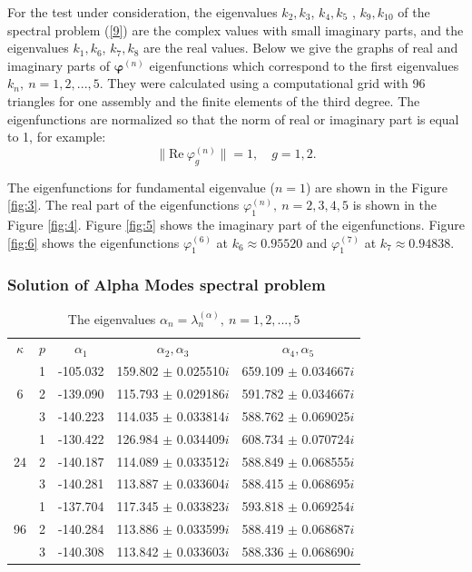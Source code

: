 \documentclass[authoryear]{elsarticle}
\begin{document}
For the test under consideration, the eigenvalues $k_2, k_3$, $k_4, k_5$ , $k_9, k_{10}$ 
of the spectral problem (\ref{9}) are the complex values with small imaginary parts, and the eigenvalues $k_1, k_6$, $k_7, k_8$ are the real values.
Below we give the graphs of real and imaginary parts of $\bm \varphi^{(n)}$ eigenfunctions which correspond to the first eigenvalues $k_n, \ n = 1, 2, ..., 5$. 
They were calculated using a computational grid with 96 triangles for one assembly and the finite elements of the third degree. The eigenfunctions are normalized so that the norm of real or imaginary part is equal to 1, for example:
\[
 \|\mathrm{Re} \ \varphi^{(n)}_g\| = 1, \quad g = 1,2. 
\] 

The eigenfunctions for fundamental eigenvalue ($n=1$) are shown in the Figure \ref{fig:3}.
The real part of the eigenfunctions $\varphi^{(n)}_1, \ n = 2,3,4,5$ is shown in the Figure \ref{fig:4}.
Figure \ref{fig:5} shows the imaginary part of the eigenfunctions. Figure \ref{fig:6} shows the eigenfunctions $\varphi^{(6)}_1$ at $k_6 \approx  0.95520$ and $\varphi^{(7)}_1$ at $k_7 \approx  0.94838$.



\subsubsection{Solution of Alpha Modes spectral problem} 
\begin{table}[h]
\caption{The eigenvalues $\alpha_n = \lambda_n^{(\alpha )}, \ n = 1,2, ..., 5$}
\label{t-3}
\begin{center}
\begin{tabular}{ccccc}
\rowcolor{col1}
$\kappa$ & $p$ & $\alpha_1$ &  $\alpha_2, \alpha_3$ &  $\alpha_4, \alpha_5$ \\ 
\rowcolor{col3}
   & 1 & -105.032 & 159.802 $\pm$ 0.025510$i$  & 659.109 $\pm$ 0.034667$i$  \\
\rowcolor{col2}
6  & 2 & -139.090 & 115.793 $\pm$ 0.029186$i$  & 591.782 $\pm$ 0.034667$i$  \\
\rowcolor{col1}
   & 3 & -140.223 & 114.035 $\pm$ 0.033814$i$  & 588.762 $\pm$ 0.069025$i$  \\
\rowcolor{col3}
   & 1 & -130.422 & 126.984 $\pm$ 0.034409$i$  & 608.734 $\pm$ 0.070724$i$  \\
\rowcolor{col2}
24 & 2 & -140.187 & 114.089 $\pm$ 0.033512$i$  & 588.849 $\pm$ 0.068555$i$  \\
\rowcolor{col1}
   & 3 & -140.281 & 113.887 $\pm$ 0.033604$i$  & 588.415 $\pm$ 0.068695$i$  \\
\rowcolor{col3}
   & 1 & -137.704 & 117.345 $\pm$ 0.033823$i$  & 593.818 $\pm$ 0.069254$i$  \\
\rowcolor{col2}
96 & 2 & -140.284 & 113.886 $\pm$ 0.033599$i$  & 588.419 $\pm$ 0.068687$i$  \\
\rowcolor{col1}
   & 3 & -140.308 & 113.842 $\pm$ 0.033603$i$  & 588.336 $\pm$ 0.068690$i$  \\
\end{tabular}
\end{center}
\end{table}
\end{document}
